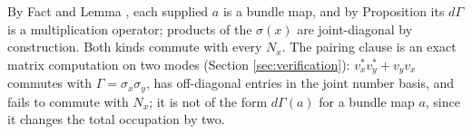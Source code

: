 By Fact  and Lemma , each supplied $a$ is a bundle map, and by Proposition  its $d\Gamma$ is a multiplication operator; products of the $\sigma(x)$ are joint-diagonal by construction. Both kinds commute with every $N_x$. The pairing clause is an exact matrix computation on two modes (Section \ref{sec:verification}): $v^{*}_x v^{*}_y + v_y v_x$ commutes with $\Gamma = \sigma_x\sigma_y$, has off-diagonal entries in the joint number basis, and fails to commute with $N_x$; it is not of the form $d\Gamma(a)$ for a bundle map $a$, since it changes the total occupation by two.
